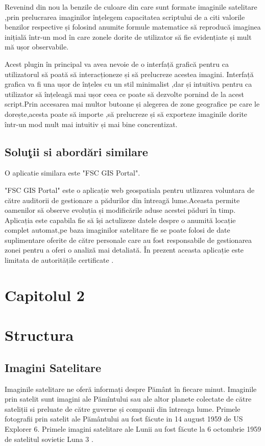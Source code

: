 \documentclass[12pt,a4paper]{article}
\theoremstyle{definition}
\theoremstyle{remark}
\begin{document}
Revenind din nou la benzile de culoare din care sunt formate imaginile satelitare ,prin prelucrarea imaginilor înțelegem capacitatea scriptului de a citi valorile benzilor respective și folosind anumite formule matematice să reproducă imaginea inițială într-un mod în care zonele dorite de utilizator să fie evidențiate și mult mă ușor observabile.


Acest plugin în principal va avea nevoie de o interfață grafică pentru ca utilizatorul să poată să interacționeze și să prelucreze acestea imagini. Interfață grafica va fi una ușor de înțeles cu un stil minimalist ,dar și intuitiva pentru ca utilizator să înțeleagă mai ușor ceea ce poate să dezvolte pornind de la acest script.Prin accesarea mai multor butoane și alegerea de zone geografice pe care le dorește,acesta poate să importe ,să prelucreze și să exporteze imaginile dorite într-un mod mult mai intuitiv și mai bine concrentizat. 


\subsection{{Solu\c tii si abord\u ari similare}}

O aplicatie similara este "FSC GIS Portal". 

"FSC GIS Portal" este o aplicație web geospatiala pentru utlizarea voluntara de către auditorii de gestionare a pădurilor din întreagă lume.Aceasta permite oamenilor să observe  evoluția și modificările aduse acestei păduri în timp. Aplicația este capabila fie să își actulizeze datele despre o anumită locație complet automat,pe baza imaginilor satelitare fie se poate folosi de date suplimentare oferite de către personale care au fost responsabile de gestionarea zonei pentru a oferi o analiz\u a mai detaliat\u a. În prezent aceasta aplicație este limitata de autoritățile certificate \cite{aplicati}.




\newpage
\section*{\bf Capitolul 2}
\markright{}
\section*{{\bf Structura}}
\markright{}
\setcounter{section}{1}
\subsection{Imagini Satelitare}
 Imaginile satelitare ne oferă informați despre Pământ în fiecare minut. Imaginile prin satelit sunt imagini ale Pămîntului sau ale altor planete colectate de către sateliții si preluate de către guverne și companii din întreaga lume. \cite{wiki} Primele fotografii prin satelit  ale Pământului au fost făcute in 14 august 1959 de US Explorer 6. Primele imagini satelitare ale Lunii au fost făcute la 6 octombrie 1959 de satelitul sovietic Luna 3 \cite{satelitare}.
\end{document}
